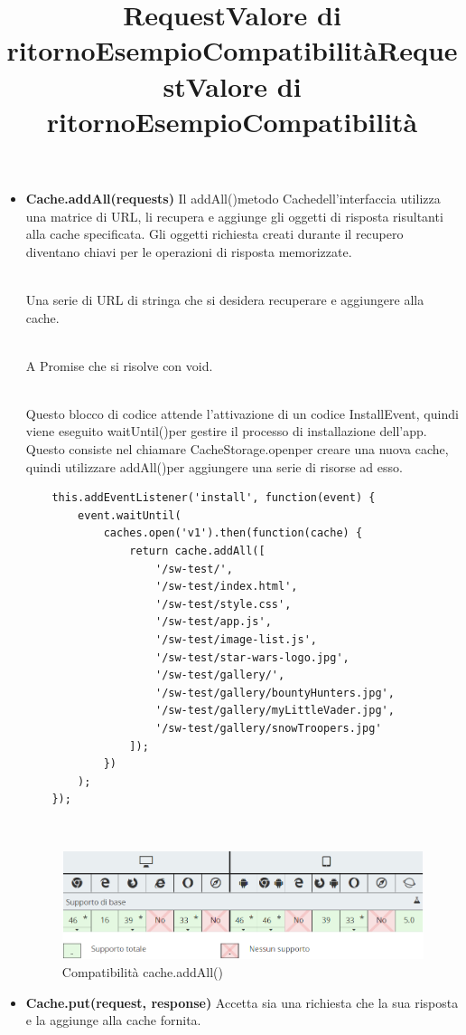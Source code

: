 \documentclass[italian]{article}
\begin{document}
\begin{itemize}
	\item \textbf{Cache.addAll(requests)}
	Il addAll()metodo Cachedell'interfaccia utilizza una matrice di URL, li recupera e aggiunge gli oggetti di risposta risultanti alla cache specificata. Gli oggetti richiesta creati durante il recupero diventano chiavi per le operazioni di risposta memorizzate. \\
	\title{\textbf{Request}}\\
	Una serie di URL di stringa che si desidera recuperare e aggiungere alla cache.\\
	\title{\textbf{Valore di ritorno}}\\
	A Promise che si risolve con void. \\
	\title{\textbf{Esempio}}\\
	Questo blocco di codice attende l'attivazione di un codice InstallEvent, quindi viene eseguito waitUntil()per gestire il processo di installazione dell'app. Questo consiste nel chiamare CacheStorage.openper creare una nuova cache, quindi utilizzare addAll()per aggiungere una serie di risorse ad esso.
	\begin{lstlisting}
	this.addEventListener('install', function(event) {
		event.waitUntil(
			caches.open('v1').then(function(cache) {
				return cache.addAll([
					'/sw-test/',
					'/sw-test/index.html',
					'/sw-test/style.css',
					'/sw-test/app.js',
					'/sw-test/image-list.js',
					'/sw-test/star-wars-logo.jpg',
					'/sw-test/gallery/',
					'/sw-test/gallery/bountyHunters.jpg',
					'/sw-test/gallery/myLittleVader.jpg',
					'/sw-test/gallery/snowTroopers.jpg'
				]);
			})
		);
	});
	\end{lstlisting}
	\title{\textbf{Compatibilità}}\\
	\begin{figure}[h]
		\centering
		\includegraphics[width=1\linewidth]{c4}
		\caption{Compatibilità cache.addAll()}
		\label{fig:Compatibilità cache.addAll()}
	\end{figure}
	
	\pagebreak
	
	
	\item \textbf{Cache.put(request, response)}
	Accetta sia una richiesta che la sua risposta e la aggiunge alla cache fornita.\\
	\title{\textbf{Request}}\\
	\title{\textbf{Valore di ritorno}}\\
	\title{\textbf{Esempio}}\\
	\title{\textbf{Compatibilità}}\\
	

\end{itemize}
\end{document}
